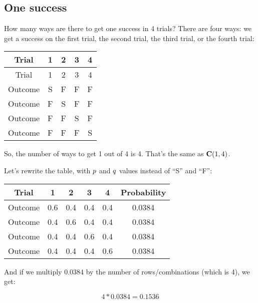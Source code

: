 \documentclass[../../../main.tex]{subfiles}
\begin{document}
\subsection{One success}

How many ways are there to get one success in 4 trials? There are four ways: we get a success on the first trial, the second trial, the third trial, or the fourth trial:

\begin{center}
  \begin{tabular}{| c | c | c | c | c |}
    \hline
    \textbf{Trial} & \textbf{1} & \textbf{2} & \textbf{3} & \textbf{4} \\ \hline
    Trial & 1 & 2 & 3 & 4 \\ \hline
  Outcome & S & F & F & F \\ \hline
  Outcome & F & S & F & F \\ \hline
  Outcome & F & F & S & F \\ \hline
  Outcome & F & F & F & S \\ \hline
  \end{tabular}
\end{center}

\noindent
So, the number of ways to get 1 out of 4 is 4. That's the same as $\mathbf{C}(1, 4)$. 

Let's rewrite the table, with $\success/$ and $\failure/$ values instead of ``S'' and ``F'':

\begin{center}
  \begin{tabular}{| c | c | c | c | c | c |}
    \hline
    \textbf{Trial} & \textbf{1} & \textbf{2} & \textbf{3} & \textbf{4} & \textbf{Probability} \\ \hline
  Outcome & 0.6 & 0.4 & 0.4 & 0.4 & 0.0384 \\ \hline
  Outcome & 0.4 & 0.6 & 0.4 & 0.4 & 0.0384 \\ \hline
  Outcome & 0.4 & 0.4 & 0.6 & 0.4 & 0.0384 \\ \hline
  Outcome & 0.4 & 0.4 & 0.4 & 0.6 & 0.0384 \\ \hline
  \end{tabular}
\end{center}

\noindent
And if we multiply 0.0384 by the number of rows/combinations (which is 4), we get:

\begin{equation*}
    4 * 0.0384 = 0.1536
\end{equation*}
\end{document}
